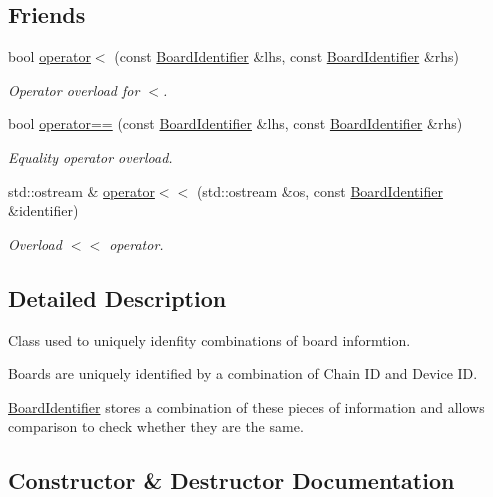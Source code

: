 \subsection*{Friends}
\begin{DoxyCompactItemize}
\item 
bool \hyperlink{class_board_identifier_a952ba26774a854af0abe8f188ddda22b}{operator$<$} (const \hyperlink{class_board_identifier}{Board\+Identifier} \&lhs, const \hyperlink{class_board_identifier}{Board\+Identifier} \&rhs)
\begin{DoxyCompactList}\small\item\em Operator overload for $<$. \end{DoxyCompactList}\item 
bool \hyperlink{class_board_identifier_a7e5f6b9a11fbed47acc7aeafab856eed}{operator==} (const \hyperlink{class_board_identifier}{Board\+Identifier} \&lhs, const \hyperlink{class_board_identifier}{Board\+Identifier} \&rhs)
\begin{DoxyCompactList}\small\item\em Equality operator overload. \end{DoxyCompactList}\item 
std\+::ostream \& \hyperlink{class_board_identifier_a7c82c259188e9ed8c552911db5c4f454}{operator$<$$<$} (std\+::ostream \&os, const \hyperlink{class_board_identifier}{Board\+Identifier} \&identifier)
\begin{DoxyCompactList}\small\item\em Overload $<$$<$ operator. \end{DoxyCompactList}\end{DoxyCompactItemize}


\subsection{Detailed Description}
Class used to uniquely idenfity combinations of board informtion. 

Boards are uniquely identified by a combination of Chain ID and Device ID.

\hyperlink{class_board_identifier}{Board\+Identifier} stores a combination of these pieces of information and allows comparison to check whether they are the same. 

\subsection{Constructor \& Destructor Documentation}
\mbox{\label{class_board_identifier_abfdd1f7aada13dbe08113942b8c033a1}} 
